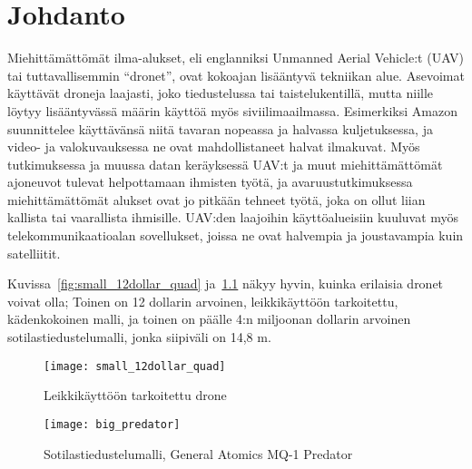 \chapter{Johdanto}
\label{ch:johdanto}
Miehittämättömät ilma-alukset, eli englanniksi Unmanned Aerial Vehicle:t (UAV)
tai tuttavallisemmin ``dronet'', ovat kokoajan lisääntyvä tekniikan alue.
Asevoimat käyttävät droneja laajasti, joko tiedustelussa tai
taistelukentillä, mutta niille löytyy lisääntyvässä määrin käyttöä myös
siviilimaailmassa. Esimerkiksi Amazon suunnittelee käyttävänsä niitä tavaran
nopeassa ja halvassa kuljetuksessa, ja video- ja valokuvauksessa ne ovat
mahdollistaneet halvat ilmakuvat. Myös tutkimuksessa ja muussa datan
keräyksessä UAV:t ja muut miehittämättömät ajoneuvot tulevat helpottamaan
ihmisten työtä, ja avaruustutkimuksessa miehittämättömät alukset ovat jo
pitkään tehneet työtä, joka on ollut liian kallista tai vaarallista ihmisille.
UAV:den laajoihin käyttöalueisiin kuuluvat myös telekommunikaatioalan
sovellukset, joissa ne ovat halvempia ja joustavampia kuin satelliitit.

Kuvissa~\ref{fig:small_12dollar_quad} ja~\ref{fig:big_predator} näkyy hyvin,
kuinka erilaisia dronet voivat olla; Toinen on 12 dollarin arvoinen,
leikkikäyttöön tarkoitettu, kädenkokoinen malli, ja toinen on päälle 4:n
miljoonan dollarin arvoinen sotilastiedustelumalli, jonka siipiväli on 14,8 m.

\begin{figure}[H]
\centering
\begin{minipage}{.5\textwidth}
  \centering
  \texttt{[image: small\_12dollar\_quad]}
  \caption{Leikkikäyttöön tarkoitettu drone~\cite{miniQuad}}
\label{fig:small_12dollar_quad}
\end{minipage}%
\begin{minipage}{.5\textwidth}
  \centering
  \texttt{[image: big\_predator]}
  \caption{Sotilastiedustelumalli, General Atomics MQ-1
    Predator~\cite{bigPredator}}
\label{fig:big_predator}
\end{minipage}
\end{figure}

